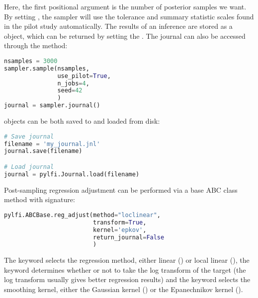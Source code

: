 Here, the first positional argument is the number of posterior samples we want. By setting , the sampler will use the tolerance and summary statistic scales found in the pilot study automatically. 
The results of an inference are stored as a  object, which can be returned by setting the . The journal can also be accessed through the method:  

\begin{lstlisting}[language=python]
nsamples = 3000
sampler.sample(nsamples,
               use_pilot=True,
               n_jobs=4,
               seed=42
               )
journal = sampler.journal()
\end{lstlisting}

 objects can be both saved to and loaded from disk: 

\begin{lstlisting}[language=python]
# Save journal
filename = 'my_journal.jnl'
journal.save(filename)

# Load journal
journal = pylfi.Journal.load(filename)
\end{lstlisting}

Post-sampling regression adjustment can be performed via a base ABC class method with signature:

\begin{lstlisting}[language=python]
pylfi.ABCBase.reg_adjust(method="loclinear",
                         transform=True,
                         kernel='epkov',
                         return_journal=False
                         )
\end{lstlisting}

The  keyword selects the regression method, either linear () or local linear (), the  keyword determines whether or not to take the log transform of the target (the log transform usually gives better regression results) and the  keyword selects the smoothing kernel, either the Gaussian kernel () or the Epanechnikov kernel (). 

